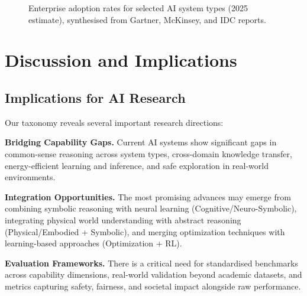 \documentclass[12pt, a4paper]{article}
\begin{document}
\begin{figure}[ht]
\centering
{}
\caption{Enterprise adoption rates for selected AI system types (2025 estimate), synthesised from Gartner, McKinsey, and IDC reports.}
\label{fig:adoption}
\end{figure}

\section{Discussion and Implications}

\subsection{Implications for AI Research}
Our taxonomy reveals several important research directions:

\textbf{Bridging Capability Gaps.} Current AI systems show significant gaps in common-sense reasoning across system types, cross-domain knowledge transfer, energy-efficient learning and inference, and safe exploration in real-world environments.

\textbf{Integration Opportunities.} The most promising advances may emerge from combining symbolic reasoning with neural learning (Cognitive/Neuro-Symbolic), integrating physical world understanding with abstract reasoning (Physical/Embodied + Symbolic), and merging optimization techniques with learning-based approaches (Optimization + RL).

\textbf{Evaluation Frameworks.} There is a critical need for standardised benchmarks across capability dimensions, real-world validation beyond academic datasets, and metrics capturing safety, fairness, and societal impact alongside raw performance.
\end{document}
